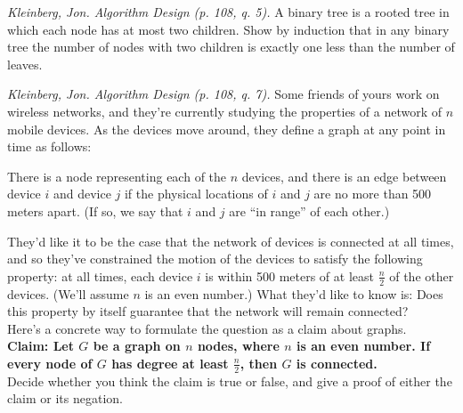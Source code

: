 \documentclass[solutionorbox,answers]{exam}
\begin{document}
\begin{questions}
\question \textit{Kleinberg, Jon. Algorithm Design (p. 108, q. 5).} A binary tree is a rooted tree in which each node has at most two children. Show by induction that in any binary tree the number of nodes with two children is exactly one less than the number of leaves. 

\nopagebreak

\begin{solutionbox}{5in}    \vspace{1em}                                                            

\end{solutionbox}
\pagebreak
\question \textit{Kleinberg, Jon. Algorithm Design (p. 108, q. 7).} Some friends of yours work on wireless networks, and they're currently studying the properties of a network of $n$ mobile devices. As the devices move around, they define a graph at any point in time as follows: 

{\leftskip=1cm\relax
 \rightskip=1cm\relax
 There is a node representing each of the $n$ devices, and there is an edge between device $i$ and device $j$ if the physical locations of $i$ and $j$ are no more than 500 meters apart. (If so, we say that $i$ and $j$ are “in range” of each other.)
 \par}

They'd like it to be the case that the network of devices is connected at all times, and so they've constrained the motion of the devices to satisfy the following property: at all times, each device $i$ is within 500 meters of at least $\frac{n}{2}$ of the other devices. (We'll assume $n$ is an even number.) What they'd like to know is: Does this property by itself guarantee that the network will remain connected? \\

Here’s a concrete way to formulate the question as a claim about graphs.\\

\textbf{Claim: Let $G$ be a graph on $n$ nodes, where $n$ is an even number. If every node of $G$ has degree at least $\frac{n}{2}$, then $G$ is connected.} \\

Decide whether you think the claim is true or false, and give a proof of either the claim or its negation. 

\begin{solutionbox}{4.5in} \vspace{1em}    

  \end{solutionbox}


\end{questions}
\end{document}
